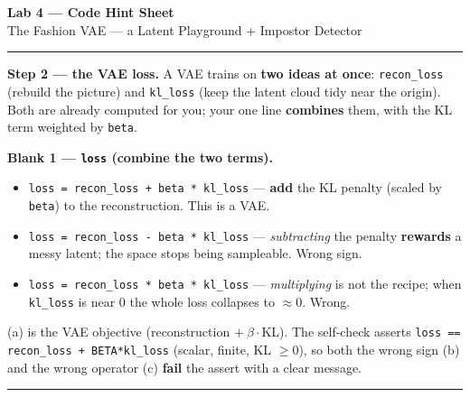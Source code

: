 \documentclass[11pt]{article}
\newcommand{\opt}[1]{\texttt{#1}}
\begin{document}
\small

\begin{center}
{\Large \textbf{Lab 4 --- Code Hint Sheet}}\\[2pt]
{\normalsize The Fashion VAE --- a Latent Playground + Impostor Detector}
\end{center}

\vspace{-2pt}
\begin{center}
\end{center}

\vspace{2pt}\hrule\vspace{4pt}

\textbf{Step 2 --- the VAE loss.}\; {\small A VAE trains on \textbf{two ideas at once}:
\opt{recon\_loss} (rebuild the picture) and \opt{kl\_loss} (keep the latent cloud tidy near the
origin). Both are already computed for you; your one line \textbf{combines} them, with the KL term
weighted by \opt{beta}.}

\textbf{Blank 1 --- \texttt{loss} (combine the two terms).}
\begin{itemize}
  \item[(a)] \opt{loss = recon\_loss + beta * kl\_loss}\; --- \textbf{add} the KL penalty (scaled by
    \opt{beta}) to the reconstruction. This is a VAE.
  \item[(b)] \opt{loss = recon\_loss - beta * kl\_loss}\; --- \emph{subtracting} the penalty
    \textbf{rewards} a messy latent; the space stops being sampleable. Wrong sign.
  \item[(c)] \opt{loss = recon\_loss * beta * kl\_loss}\; --- \emph{multiplying} is not the recipe;
    when \opt{kl\_loss} is near 0 the whole loss collapses to $\approx 0$. Wrong.
\end{itemize}
{\small (a) is the VAE objective (reconstruction $+\ \beta\cdot$KL). The self-check asserts
\opt{loss == recon\_loss + BETA*kl\_loss} (scalar, finite, KL $\geq 0$), so both the wrong sign (b)
and the wrong operator (c) \textbf{fail} the assert with a clear message.}

\vspace{3pt}\hrule\vspace{4pt}
\end{document}

